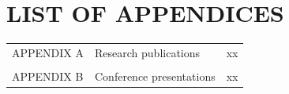\chapter{LIST OF APPENDICES}

\begin{tabular}{p{3.0cm}p{9.0cm}p{2.0cm}} 
APPENDIX A & Research publications & xx\\ %
\\
APPENDIX B & Conference presentations & xx\\ %
\end{tabular}
\\